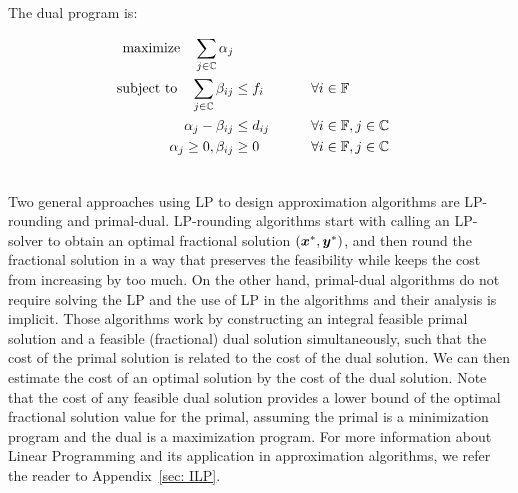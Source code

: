 \documentclass[oneside,final]{ucr}
\begin{document}

\noindent
The dual program is:

\begin{alignat}{3}
  \textrm{maximize}\quad \sum_{j\in \mathbb{C}} \alpha_j&\label{eqn:ufl_dual}  
  \\ \notag
  \textrm{subject to} \quad 
  \sum_{j\in \mathbb{C}}\beta_{ij} &\leq f_i  &\quad\quad &\forall i \in \mathbb{F}  
  \\ \notag
  \alpha_{j} - \beta_{ij} &\leq  d_{ij} &  & \forall i\in \mathbb{F}, j\in \mathbb{C} 
  \\ \notag
  \alpha_j \geq 0, \beta_{ij} &\geq 0 &  & \forall i\in \mathbb{F}, j\in \mathbb{C}
  \\ \notag
\end{alignat}

Two general approaches using LP to design approximation
algorithms are LP-rounding and primal-dual. LP-rounding
algorithms start with calling an LP-solver to obtain an
optimal fractional solution $(\boldsymbol{x}^\ast,\boldsymbol{y}^\ast)$, and
then round the fractional solution in a way that preserves
the feasibility while keeps the cost from increasing by too
much. On the other hand, primal-dual algorithms do not
require solving the LP and the use of LP in the algorithms
and their analysis is implicit. Those algorithms work by
constructing an integral feasible primal solution and a
feasible (fractional) dual solution simultaneously, such
that the cost of the primal solution is related to the cost
of the dual solution. We can then estimate the cost of an
optimal solution by the cost of the dual solution. Note that
the cost of any feasible dual solution provides a lower
bound of the optimal fractional solution value for the
primal, assuming the primal is a minimization program and
the dual is a maximization program. For more information
about Linear Programming and its application in
approximation algorithms, we refer the reader to
Appendix~\ref{sec: ILP}.
\end{document}
